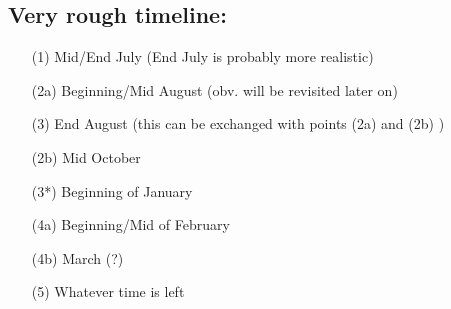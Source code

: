 \documentclass[10pt,a4paper]{article}
\begin{document}
\subsection*{Very rough timeline:}
\begin{itemize}
\item[(1) ] Mid/End July (End July is probably more realistic)
\item[(2a)] Beginning/Mid August (obv. will be revisited later on)
\item[(3) ] End August (this can be exchanged with points (2a) and (2b) )
\item[(2b)] Mid October
\item[(3*)] Beginning of January
\item[(4a)] Beginning/Mid of February
\item[(4b)] March (?)
\item[(5) ] Whatever time is left
\end{itemize}
\end{document}
